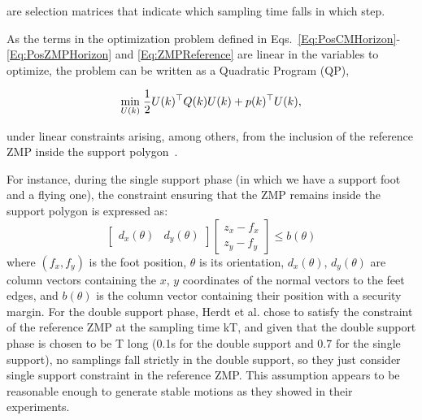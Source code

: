 \noindent are selection matrices that indicate which sampling time falls in which step.

As the terms in the optimization problem defined in Eqs.~\ref{Eq:PosCMHorizon}-\ref{Eq:PosZMPHorizon} and \ref{Eq:ZMPReference} are linear in the variables to optimize, the problem can be written as a Quadratic Program (QP),

\begin{equation}
 \underset{U(k)}{\min} \; \dfrac{1}{2} U(k)^{\top} Q(k) U(k) + p(k)^{\top} U(k),
\label{Eq:QP}
\end{equation}

\noindent under linear constraints arising, among others, from the inclusion of the reference ZMP inside the support polygon~\citep{HerdtAR2010}.

For instance, during the single support phase (in which we have a support foot and a flying one), the constraint ensuring that the ZMP remains inside the support polygon is expressed as:
\begin{equation}
  \begin{bmatrix} d_x(\theta) & d_y(\theta) \end{bmatrix}
  \begin{bmatrix} z_x - f_x \\ z_y - f_y \end{bmatrix} \leq b(\theta)
\end{equation}
where $(f_x,f_y)$ is the foot position, $\theta$ is its orientation,
$d_x(\theta)$, $d_y(\theta)$ are column vectors containing the $x$,
$y$ coordinates of the normal vectors to the feet edges, and $b(\theta)$  is the column vector containing their position with a security margin. For the double support phase, Herdt et al. chose to satisfy the constraint of the reference ZMP at the sampling time kT, and given that the double support phase is chosen to be T long (0.1s for the double support and 0.7 for the single support), no samplings fall strictly in the double support, so they just consider single support constraint in the reference ZMP. This assumption appears to be reasonable enough to generate stable motions as they showed in their experiments.
